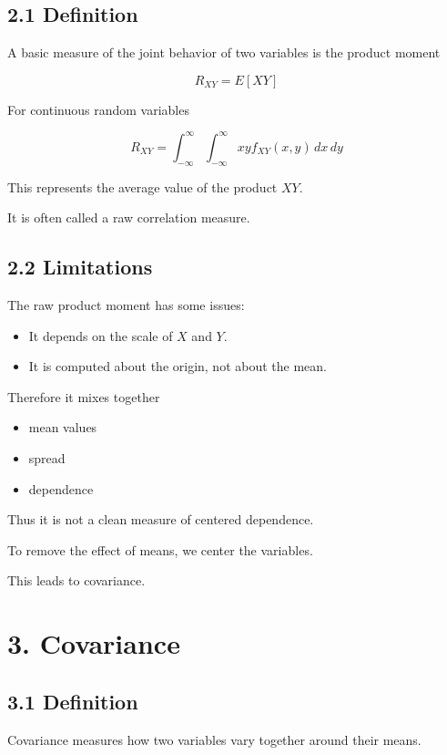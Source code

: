 \documentclass[12pt]{article}
\begin{document}
\subsection*{2.1 Definition}

A basic measure of the joint behavior of two variables is the product moment

\[
R_{XY}=E[XY]
\]

For continuous random variables

\[
R_{XY}=\int_{-\infty}^{\infty}\int_{-\infty}^{\infty} xy f_{XY}(x,y) \, dx\, dy
\]

This represents the average value of the product $XY$.

It is often called a raw correlation measure.

\subsection*{2.2 Limitations}

The raw product moment has some issues:

\begin{itemize}
\item It depends on the scale of $X$ and $Y$.
\item It is computed about the origin, not about the mean.
\end{itemize}

Therefore it mixes together

\begin{itemize}
\item mean values
\item spread
\item dependence
\end{itemize}

Thus it is not a clean measure of centered dependence.

To remove the effect of means, we center the variables.

This leads to covariance.

\section*{3. Covariance}

\subsection*{3.1 Definition}

Covariance measures how two variables vary together around their means.
\end{document}
